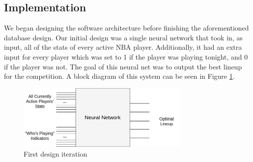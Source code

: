 \subsection{Implementation}
We began designing the software architecture before finishing the aforementioned database design. Our initial design was a single neural network that took in, as input, all of the stats of every active NBA player. Additionally, it had an extra input for every player which was set to 1 if the player was playing tonight, and 0 if the player was not. The goal of this neural net was to output the best lineup for the competition. A block diagram of this system can be seen in Figure \ref{fig:first_iteration}.
\begin{figure}[ht]
    \centering
    \includegraphics[width=0.75\textwidth]{figures/first_iteration}
    \caption{First design iteration}
    \label{fig:first_iteration}
\end{figure}
 
